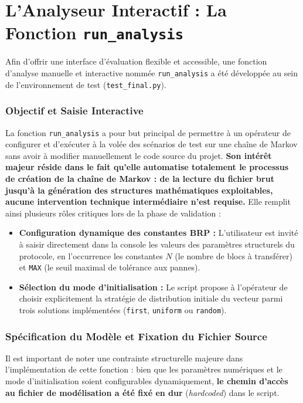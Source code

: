 \documentclass[14pt, a4paper]{extarticle}
\begin{document}
\section{L'Analyseur Interactif : La Fonction \texttt{run\_analysis}}

Afin d'offrir une interface d'évaluation flexible et accessible, une fonction d'analyse manuelle et interactive nommée \texttt{run\_analysis} a été développée au sein de l'environnement de test (\texttt{test\_final.py}).

\subsubsection{Objectif et Saisie Interactive}
La fonction \texttt{run\_analysis} a pour but principal de permettre à un opérateur de configurer et d'exécuter à la volée des scénarios de test sur une chaîne de Markov sans avoir à modifier manuellement le code source du projet. \textbf{Son intérêt majeur réside dans le fait qu'elle automatise totalement le processus de création de la chaîne de Markov : de la lecture du fichier brut jusqu'à la génération des structures mathématiques exploitables, aucune intervention technique intermédiaire n'est requise.} Elle remplit ainsi plusieurs rôles critiques lors de la phase de validation :
\begin{itemize}
    \item \textbf{Configuration dynamique des constantes BRP :} L'utilisateur est invité à saisir directement dans la console les valeurs des paramètres structurels du protocole, en l'occurrence les constantes $N$ (le nombre de blocs à transférer) et \texttt{MAX} (le seuil maximal de tolérance aux pannes).
    \item \textbf{Sélection du mode d'initialisation :} Le script propose à l'opérateur de choisir explicitement la stratégie de distribution initiale du vecteur parmi trois solutions implémentées (\texttt{first}, \texttt{uniform} ou \texttt{random}).
\end{itemize}

\subsubsection{Spécification du Modèle et Fixation du Fichier Source}
Il est important de noter une contrainte structurelle majeure dans l'implémentation de cette fonction : bien que les paramètres numériques et le mode d'initialisation soient configurables dynamiquement, \textbf{le chemin d'accès au fichier de modélisation a été fixé en dur} (\textit{hardcoded}) dans le script. 
\end{document}
